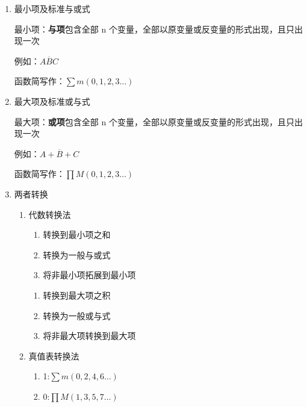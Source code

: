 \begin{enumerate}

    \item 最小项及标准与或式

          最小项：\textbf{与项}包含全部 n 个变量，全部以原变量或反变量的形式出现，且只出现一次

          例如：$A\overline{B}C$

          函数简写作：$\sum{m(0,1,2,3\dots)}$

    \item 最大项及标准或与式

          最大项：\textbf{或项}包含全部 n 个变量，全部以原变量或反变量的形式出现，且只出现一次

          例如：$A+\overline{B}+C$

          函数简写作：$\prod{M(0,1,2,3\dots)}$

    \item 两者转换

          \begin{enumerate}

              \item 代数转换法

                    \begin{enumerate}

                        \item 转换到最小项之和
                        \item 转换为一般与或式
                        \item 将非最小项拓展到最小项

                    \end{enumerate}

                    \begin{enumerate}

                        \item 转换到最大项之积
                        \item 转换为一般或与式
                        \item 将非最大项转换到最大项

                    \end{enumerate}

              \item 真值表转换法

                    \begin{enumerate}

                        \item 1:$\sum{m(0,2,4,6\dots)}$
                        \item 0:$\prod{M(1,3,5,7\dots)}$

                    \end{enumerate}

          \end{enumerate}

\end{enumerate}

